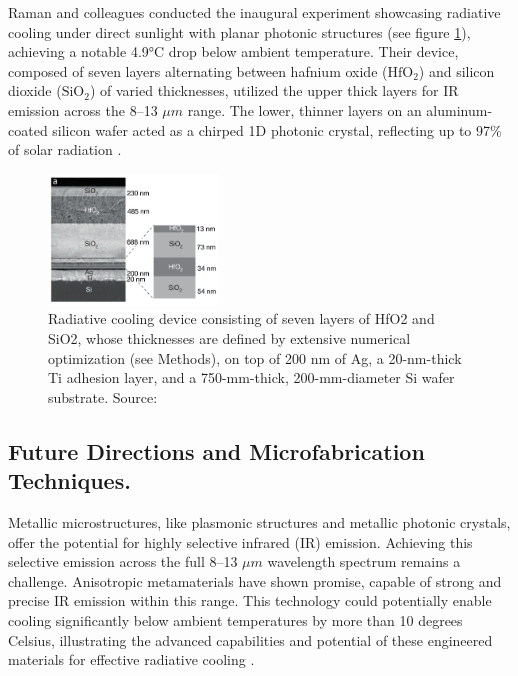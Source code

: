 Raman and colleagues conducted the inaugural experiment showcasing radiative cooling under direct sunlight with planar photonic structures (see figure \ref{fig:planar_photonic_device}), achieving a notable 4.9°C drop below ambient temperature. Their device, composed of seven layers alternating between hafnium oxide ($\text{HfO}_2$) and silicon dioxide ($\text{SiO}_2$) of varied thicknesses, utilized the upper thick layers for IR emission across the 8–13 $\mu m$ range. The lower, thinner layers on an aluminum-coated silicon wafer acted as a chirped 1D photonic crystal, reflecting up to 97\% of solar radiation \cite{raman_passive_2014}.

\begin{figure}[ht!]
  \centering
  \includegraphics[width=0.4\textwidth]{Chapters/Figures/Planar Photonic Devices}
  \caption{Radiative cooling device consisting of seven layers of HfO2 and SiO2, whose thicknesses are defined by extensive numerical optimization (see Methods), on top of 200 nm of Ag, a 20-nm-thick Ti adhesion layer, and a 750-mm-thick, 200-mm-diameter Si wafer substrate. Source: \cite{raman_passive_2014}}
  \label{fig:planar_photonic_device}
\end{figure}

\subsection{Future Directions and Microfabrication Techniques.}
Metallic microstructures, like plasmonic structures and metallic photonic crystals, offer the potential for highly selective infrared (IR) emission. Achieving this selective emission across the full 8–13 $\mu m$ wavelength spectrum remains a challenge. Anisotropic metamaterials have shown promise, capable of strong and precise IR emission within this range. This technology could potentially enable cooling significantly below ambient temperatures by more than 10 degrees Celsius, illustrating the advanced capabilities and potential of these engineered materials for effective radiative cooling \cite{hossain_radiative_2016}.

